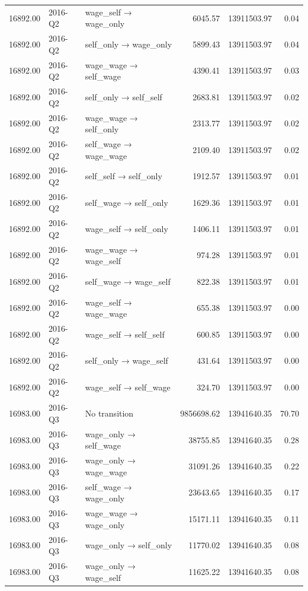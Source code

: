 \begin{table}[ht]
{\begin{tabular}{rllrrr}
  16892.00 & 2016-Q2 & wage\_self → wage\_only & 6045.57 & 13911503.97 & 0.04 \\ 
  16892.00 & 2016-Q2 & self\_only → wage\_only & 5899.43 & 13911503.97 & 0.04 \\ 
  16892.00 & 2016-Q2 & wage\_wage → self\_wage & 4390.41 & 13911503.97 & 0.03 \\ 
  16892.00 & 2016-Q2 & self\_only → self\_self & 2683.81 & 13911503.97 & 0.02 \\ 
  16892.00 & 2016-Q2 & wage\_wage → self\_only & 2313.77 & 13911503.97 & 0.02 \\ 
  16892.00 & 2016-Q2 & self\_wage → wage\_wage & 2109.40 & 13911503.97 & 0.02 \\ 
  16892.00 & 2016-Q2 & self\_self → self\_only & 1912.57 & 13911503.97 & 0.01 \\ 
  16892.00 & 2016-Q2 & self\_wage → self\_only & 1629.36 & 13911503.97 & 0.01 \\ 
  16892.00 & 2016-Q2 & wage\_self → self\_only & 1406.11 & 13911503.97 & 0.01 \\ 
  16892.00 & 2016-Q2 & wage\_wage → wage\_self & 974.28 & 13911503.97 & 0.01 \\ 
  16892.00 & 2016-Q2 & self\_wage → wage\_self & 822.38 & 13911503.97 & 0.01 \\ 
  16892.00 & 2016-Q2 & wage\_self → wage\_wage & 655.38 & 13911503.97 & 0.00 \\ 
  16892.00 & 2016-Q2 & wage\_self → self\_self & 600.85 & 13911503.97 & 0.00 \\ 
  16892.00 & 2016-Q2 & self\_only → wage\_self & 431.64 & 13911503.97 & 0.00 \\ 
  16892.00 & 2016-Q2 & wage\_self → self\_wage & 324.70 & 13911503.97 & 0.00 \\ 
  16983.00 & 2016-Q3 & No transition & 9856698.62 & 13941640.35 & 70.70 \\ 
  16983.00 & 2016-Q3 & wage\_only → self\_wage & 38755.85 & 13941640.35 & 0.28 \\ 
  16983.00 & 2016-Q3 & wage\_only → wage\_wage & 31091.26 & 13941640.35 & 0.22 \\ 
  16983.00 & 2016-Q3 & self\_wage → wage\_only & 23643.65 & 13941640.35 & 0.17 \\ 
  16983.00 & 2016-Q3 & wage\_wage → wage\_only & 15171.11 & 13941640.35 & 0.11 \\ 
  16983.00 & 2016-Q3 & wage\_only → self\_only & 11770.02 & 13941640.35 & 0.08 \\ 
  16983.00 & 2016-Q3 & wage\_only → wage\_self & 11625.22 & 13941640.35 & 0.08 \\ 

\end{tabular}}
\end{table}

